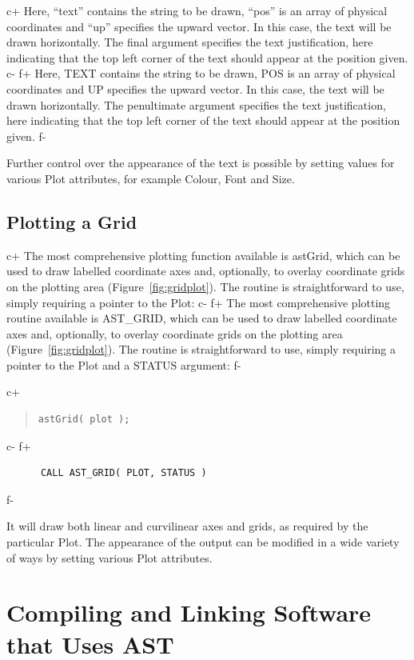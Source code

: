 \documentclass[twoside,11pt]{article}
\begin{document}
c+
Here, ``text'' contains the string to be drawn, ``pos'' is an array of
physical coordinates and ``up'' specifies the upward vector. In this
case, the text will be drawn horizontally. The final argument
specifies the text justification, here indicating that the top left
corner of the text should appear at the position given.
c-
f+
Here, TEXT contains the string to be drawn, POS is an array of
physical coordinates and UP specifies the upward vector. In this case,
the text will be drawn horizontally. The penultimate argument
specifies the text justification, here indicating that the top left
corner of the text should appear at the position given.
f-

Further control over the appearance of the text is possible by setting
values for various Plot attributes, for example Colour, Font and Size.

\subsection{\label{ss:plottingagrid}Plotting a Grid}

c+
The most comprehensive plotting function available is astGrid, which
can be used to draw labelled coordinate axes and, optionally, to
overlay coordinate grids on the plotting area
(Figure~\ref{fig:gridplot}). The routine is straightforward to use,
simply requiring a pointer to the Plot:
c-
f+
The most comprehensive plotting routine available is AST\_GRID, which
can be used to draw labelled coordinate axes and, optionally, to
overlay coordinate grids on the plotting area
(Figure~\ref{fig:gridplot}). The routine is straightforward to use,
simply requiring a pointer to the Plot and a STATUS argument:
f-

c+
\begin{quote}
\small
\begin{verbatim}
astGrid( plot );
\end{verbatim}
\normalsize
\end{quote}
c-
f+
\small
\begin{verbatim}
      CALL AST_GRID( PLOT, STATUS )
\end{verbatim}
\normalsize
f-

It will draw both linear and curvilinear axes and grids, as required
by the particular Plot. The appearance of the output can be modified
in a wide variety of ways by setting various Plot attributes.

\cleardoublepage
\section{Compiling and Linking Software that Uses AST}
\end{document}
